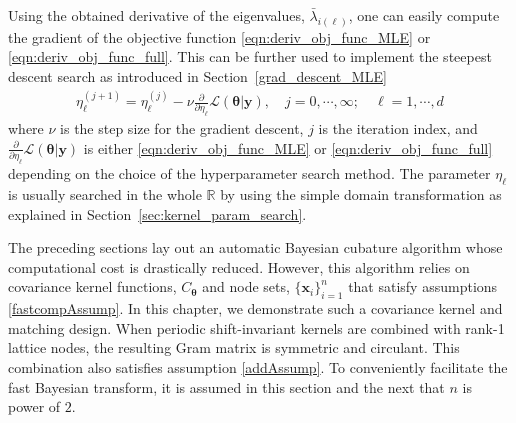 \documentclass{iitthesis}          %
\newcommand{\bm}[1]{\boldsymbol{#1}}
\newcommand{\reals}{\mathbb{R}}
\newcommand{\vtheta}{{\bm{\theta}}}
\newcommand{\vx}{\bm{x}}
\newcommand{\vy}{\bm{y}}
\newcommand\secref{Section~\ref}
\begin{document}
Using the obtained derivative of the eigenvalues, $\bar{\lambda}_{i(\ell)}$, one can easily compute the gradient of the objective function \eqref{eqn:deriv_obj_func_MLE} or \eqref{eqn:deriv_obj_func_full}. This can be further used to implement the steepest descent search as introduced in \secref{grad_descent_MLE} 
\begin{align*}
\eta^{(j+1)}_\ell = \eta^{(j)}_\ell - \nu \frac{\partial}{\partial \eta_\ell} \mathcal{L}(\vtheta | \vy), \quad j=0,\cdots, \infty; \quad \ell = 1, \cdots, d
\end{align*}
where $\nu$ is the step size for the gradient descent, $j$ is the iteration index, and $\frac{\partial}{\partial \eta_\ell} \mathcal{L}(\vtheta | \vy)$ is either \eqref{eqn:deriv_obj_func_MLE} or \eqref{eqn:deriv_obj_func_full} depending on the choice of the hyperparameter search method. The parameter $\eta_\ell$ is usually searched in the whole $\reals$ by using the simple domain transformation as explained in Section~\ref{sec:kernel_param_search}.












\label{sec:shift_invariant_kernel}

The preceding sections lay out an automatic Bayesian cubature algorithm whose computational cost is drastically reduced.  However, this algorithm relies on covariance kernel functions, $C_{\vtheta}$ and node sets, $\{\vx_i\}_{i=1}^n$ that satisfy assumptions \eqref{fastcompAssump}.  
In this chapter, we demonstrate such a covariance kernel and matching design.
When periodic shift-invariant kernels are combined with rank-1 lattice nodes, the resulting Gram matrix is symmetric and circulant. 
This combination also satisfies assumption \eqref{addAssump}.  To conveniently facilitate the fast Bayesian transform, it is assumed in this section and the next that $n$ is power of $2$.  
\end{document}
